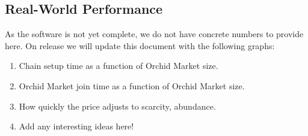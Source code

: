\subsection{Real-World Performance}

As the software is not yet complete, we do not have concrete numbers
to provide here. On release we will update this document with the
following graphs:

\begin{enumerate}
\item Chain setup time as a function of Orchid Market size.
\item Orchid Market join time as a function of Orchid Market size.
\item How quickly the price adjusts to scarcity, abundance.
\item Add any interesting ideas here!
\end{enumerate}
